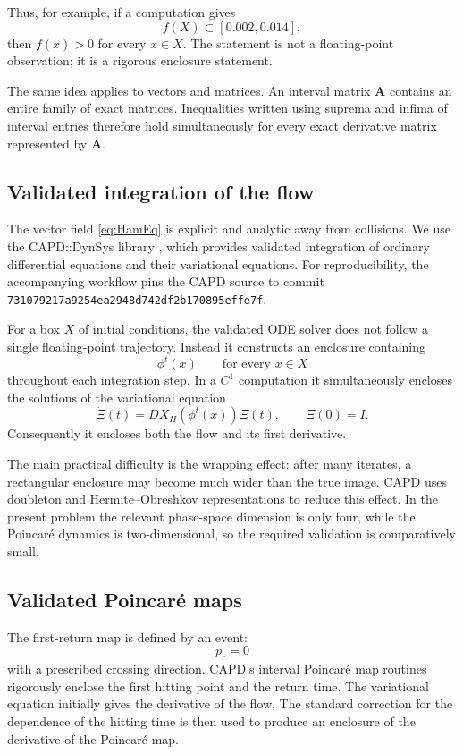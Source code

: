 \documentclass[11pt]{article}
\newcommand{\pr}{p_r}
\begin{document}
Thus, for example, if a computation gives
\[
 f(X)\subset[0.002,0.014],
\]
then $f(x)>0$ for every $x\in X$.  The statement is not a floating-point
observation; it is a rigorous enclosure statement.

The same idea applies to vectors and matrices.  An interval matrix
$\mathbf A$ contains an entire family of exact matrices.  Inequalities
written using suprema and infima of interval entries therefore hold
simultaneously for every exact derivative matrix represented by
$\mathbf A$.

\subsection{Validated integration of the flow}

The vector field \eqref{eq:HamEq} is explicit and analytic away from
collisions.  We use the CAPD::DynSys library
\cite{KapelaMrozekWilczakZgliczynski}, which provides validated integration
of ordinary differential equations and their variational equations.  For
reproducibility, the accompanying workflow pins the CAPD source to commit
\texttt{731079217a9254ea2948d742df2b170895effe7f}.

For a box $X$ of initial conditions, the validated ODE solver does not follow
a single floating-point trajectory.  Instead it constructs an enclosure
containing
\[
 \phi^t(x)
 \qquad\text{for every }x\in X
\]
throughout each integration step.  In a $C^1$ computation it simultaneously
encloses the solutions of the variational equation
\[
 \dot\Xi(t)=DX_H(\phi^t(x))\Xi(t),
 \qquad \Xi(0)=I.
\]
Consequently it encloses both the flow and its first derivative.

The main practical difficulty is the wrapping effect: after many iterates,
a rectangular enclosure may become much wider than the true image.
CAPD uses doubleton and Hermite--Obreshkov representations to reduce this
effect.  In the present problem the relevant phase-space dimension is only
four, while the Poincar\'e dynamics is two-dimensional, so the required
validation is comparatively small.

\subsection{Validated Poincar\'e maps}

The first-return map is defined by an event:
\[
 \pr=0
\]
with a prescribed crossing direction.  CAPD's interval Poincar\'e map
routines rigorously enclose the first hitting point and the return time.
The variational equation initially gives the derivative of the flow.  The
standard correction for the dependence of the hitting time is then used to
produce an enclosure of the derivative of the Poincar\'e map.
\end{document}
